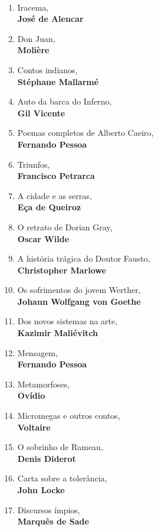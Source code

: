 \ifodd\thepage\paginabranca\else\clearpage\fi
\pagestyle{empty}

\begingroup
\scriptsize
{}\\
\begin{enumerate} [font=\Formular\scriptsize]
\setlength\parskip{8pt}
\setlength\itemsep{-1.4mm}
\item Iracema,\\ \textbf{José de Alencar}
\item Don Juan,\\ \textbf{Molière}
\item Contos indianos,\\ \textbf{Stéphane Mallarmé}
\item Auto da barca do Inferno,\\ \textbf{Gil Vicente}
\item Poemas completos de Alberto Caeiro,\\ \textbf{Fernando Pessoa}
\item Triunfos,\\ \textbf{Francisco Petrarca}
\item A cidade e as serras,\\ \textbf{Eça de Queiroz}
\item O retrato de Dorian Gray,\\ \textbf{Oscar Wilde}
\item A história trágica do Doutor Fausto,\\ \textbf{Christopher Marlowe}
\item Os sofrimentos do jovem Werther,\\ \textbf{Johann Wolfgang von Goethe}
\item Dos novos sistemas na arte,\\ \textbf{Kazimir Maliévitch}
\item Mensagem,\\ \textbf{Fernando Pessoa}
\item Metamorfoses,\\ \textbf{Ovídio}
\item Micromegas e outros contos,\\ \textbf{Voltaire}
\item O sobrinho de Rameau,\\ \textbf{Denis Diderot}
\item Carta sobre a tolerância,\\ \textbf{John Locke}
\item Discursos ímpios,\\ \textbf{Marquês de Sade}

\end{enumerate}
